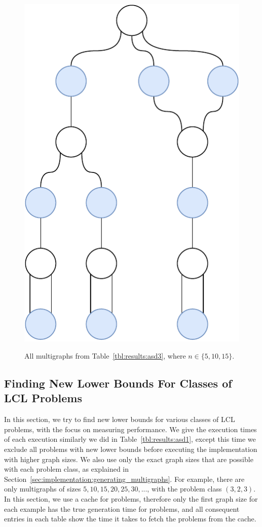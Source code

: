 \begin{figure}[H]
{    }
    \hfill
       {
      \centering
      \includegraphics[scale=0.35]{diagrams/results_multigraph_n15_12.pdf}
    }
    \caption{All multigraphs from Table~\ref{tbl:results:asd3}, where $n \in \{5,10,15\}.$}
    \label{fig:results:graphs}
  \end{figure}


\subsection{Finding New Lower Bounds For Classes of LCL Problems} \label{sec:results:classifying_large_classes}
In this section, we try to find new lower bounds for various classes of LCL problems, with the focus on measuring performance.
We give the execution times of each execution similarly we did in Table~\ref{tbl:results:asd1}, except this time we exclude all problems with new lower bounds before executing the implementation with higher graph sizes.
We also use only the exact graph sizes that are possible with each problem class, as explained in Section~\ref{sec:implementation:generating_multigraphs}.
For example, there are only multigraphs of sizes $5, 10, 15, 20, 25, 30, ...$, with the problem class $(3,2,3)$.
In this section, we use a cache for problems, therefore only the first graph size for each example has the true generation time for problems, and all consequent entries in each table show the time it takes to fetch the problems from the cache.

